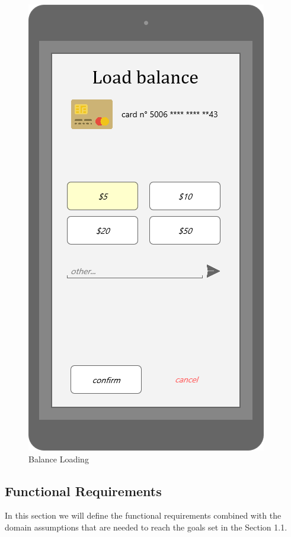 \documentclass{article}
\begin{document}
\begin{figure}[H]
\centering
\includegraphics[width=0.2\linewidth]{07-Credit_card_balance_loading.png}
\caption{Balance Loading	}
\label{fig:MU16}
\end{figure}
\newpage
\subsection{Functional Requirements}
In this section we will define the functional requirements combined with the domain assumptions that are needed to reach the goals set in the Section 1.1.
\end{document}
